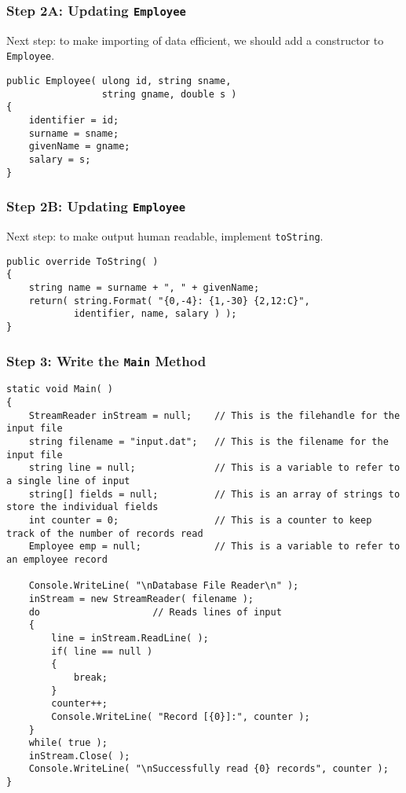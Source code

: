 \begin{frame}[fragile]
\frametitle{Step 2A: Updating \texttt{Employee}}
Next step: to make importing of data efficient, we should add a constructor to \texttt{Employee}.

\begin{verbatim}
public Employee( ulong id, string sname, 
                 string gname, double s )
{
    identifier = id;
    surname = sname;
    givenName = gname;
    salary = s;
}
\end{verbatim}

\end{frame}

\begin{frame}[fragile]
\frametitle{Step 2B: Updating \texttt{Employee}}
Next step: to make output human readable, implement \texttt{toString}.

\begin{verbatim}
public override ToString( )
{
    string name = surname + ", " + givenName;
    return( string.Format( "{0,-4}: {1,-30} {2,12:C}",
            identifier, name, salary ) );
}
\end{verbatim}

\end{frame}

\begin{frame}[fragile]
\frametitle{Step 3: Write the \texttt{Main} Method}
{\tiny
\begin{verbatim}
static void Main( )
{
    StreamReader inStream = null;    // This is the filehandle for the input file
    string filename = "input.dat";   // This is the filename for the input file
    string line = null;              // This is a variable to refer to a single line of input
    string[] fields = null;          // This is an array of strings to store the individual fields
    int counter = 0;                 // This is a counter to keep track of the number of records read
    Employee emp = null;             // This is a variable to refer to an employee record

    Console.WriteLine( "\nDatabase File Reader\n" );
    inStream = new StreamReader( filename );
    do                    // Reads lines of input
    {        
        line = inStream.ReadLine( );
        if( line == null )
        {
            break;
        }
        counter++;
        Console.WriteLine( "Record [{0}]:", counter );
    }
    while( true );
    inStream.Close( );
    Console.WriteLine( "\nSuccessfully read {0} records", counter );
}
\end{verbatim}
}
\end{frame}

